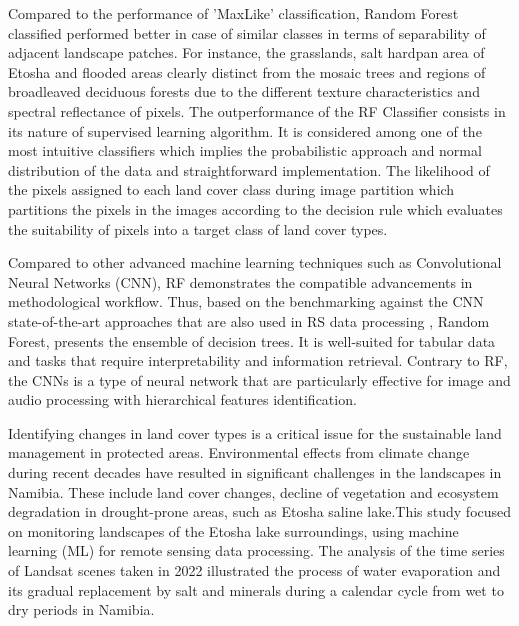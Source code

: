 \documentclass[climate,article,submit,pdftex,moreauthors]{Definitions/mdpi}
\begin{document}
Compared to the performance of 'MaxLike' classification, Random Forest classified performed better in case of similar classes in terms of separability of adjacent landscape patches. For instance, the grasslands, salt hardpan area of Etosha and flooded areas clearly distinct from the mosaic trees and regions of broadleaved deciduous forests due to the different texture characteristics and spectral reflectance of pixels. {The outperformance of the RF Classifier consists in its nature of supervised learning algorithm. It is considered among one of the most intuitive classifiers which implies the probabilistic approach and normal distribution of the data and straightforward implementation. The likelihood of the pixels assigned to each land cover class during image partition which partitions the pixels in the images according to the decision rule which evaluates the suitability of pixels into a target class of land cover types.}

{Compared to other advanced machine learning techniques such as Convolutional Neural Networks (CNN), RF demonstrates the  compatible advancements in methodological workflow. Thus, based on the benchmarking against the CNN state-of-the-art approaches that are also used in RS data processing} \cite{Wang17012022,Ma31122023,Zhaoetal2022}, {Random Forest, presents the ensemble of decision trees. It is well-suited for tabular data and tasks that require interpretability and information retrieval. Contrary to RF, the CNNs is a type of neural network that are particularly effective for image and audio processing with hierarchical features identification.}

{Identifying changes in land cover types is a critical issue for the sustainable land management in protected areas. Environmental effects from climate change during recent decades have resulted in significant challenges in the landscapes in Namibia. These include land cover changes, decline of vegetation and ecosystem degradation in drought-prone areas, such as Etosha saline lake.This study focused on monitoring landscapes of the Etosha lake surroundings, using machine learning (ML) for remote sensing data processing. }The{ analysis of the time series of Landsat scenes taken in 2022 illustrated the process of water evaporation and its gradual replacement by salt and minerals during a calendar cycle from wet to dry periods in Namibia}. 
\end{document}
